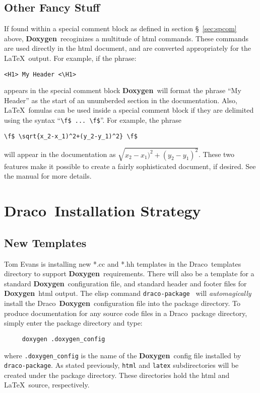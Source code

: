 \documentclass[11pt]{nmemo}
\newcommand{\draco}{{\normalfont\sffamily Draco}}
\newcommand{\doxy}{{\normalfont\bfseries Doxygen}}
\begin{document}
\subsection{Other Fancy Stuff}

If found within a special comment block 
as defined in section \S~\ref{sec:spcom} above, \doxy\ 
recoginizes a multitude of html commands. These
commands are used directly in the html document, and are converted appropriately for
the \LaTeX\ output. 
For example, if the phrase: 
\begin{verbatim}
<H1> My Header <\H1>
\end{verbatim} appears in the special comment
block \doxy\ will format the phrase ``My Header'' as the start of an
unumberded section in the documentation. 
Also, \LaTeX\ fomulas can be used inside a special
comment block if they are delimited using the syntax ``\verb+\f$ ... \f$+''.
For example, the phrase 
\begin{verbatim}
\f$ \sqrt{x_2-x_1)^2+(y_2-y_1)^2} \f$ 
\end{verbatim}  will appear in the
documentation as $\sqrt{x_2-x_1)^2+(y_2-y_1)^2}$.
These two
features make it possible to create a fairly sophisticated document, if desired.
See the manual for more details.



\section{\draco\ Installation Strategy}
\label{sec:draco}

\subsection{New Templates}

Tom Evans is installing new *.cc and *.hh templates in the \draco\ 
templates directory to support \doxy\ requirements. There will also be
a template for a standard \doxy\ configuration file, and standard
header and footer files for \doxy\ html output.  The elisp command
\texttt{draco-package}~\cite{xtm:9909} will \textit{automagically}
install the \draco\ \doxy\ configuration file into the package
directory. To produce documentation for any source code files in a
\draco\ package directory, simply enter the package directory and
type:
\begin{verbatim}
     doxygen .doxygen_config
\end{verbatim}
where \texttt{.doxygen\_config} is the name of the \doxy\ config file
installed by \texttt{draco-package}.  As stated previously,
\texttt{html} and \texttt{latex} subdirectories will be created under
the package directory.  These directories hold the html and \LaTeX\ 
source, respectively.
\end{document}
